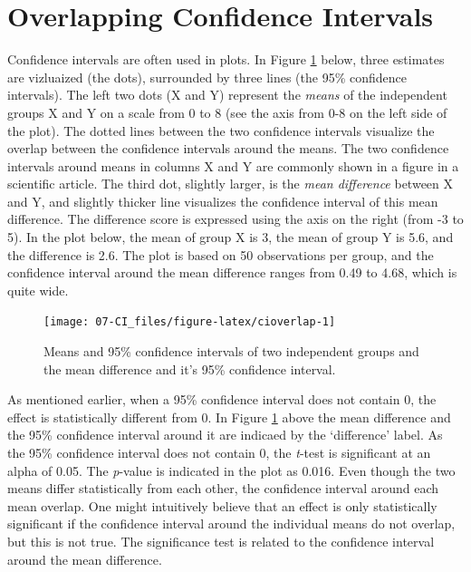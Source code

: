 \documentclass[
  oneside]{book}
\begin{document}
\hypertarget{overlapping-confidence-intervals}{%
\section{Overlapping Confidence Intervals}\label{overlapping-confidence-intervals}}

Confidence intervals are often used in plots. In Figure \ref{fig:cioverlap} below, three estimates are vizluaized (the dots), surrounded by three lines (the 95\% confidence intervals). The left two dots (X and Y) represent the \emph{means} of the independent groups X and Y on a scale from 0 to 8 (see the axis from 0-8 on the left side of the plot). The dotted lines between the two confidence intervals visualize the overlap between the confidence intervals around the means. The two confidence intervals around means in columns X and Y are commonly shown in a figure in a scientific article. The third dot, slightly larger, is the \emph{mean difference} between X and Y, and slightly thicker line visualizes the confidence interval of this mean difference. The difference score is expressed using the axis on the right (from -3 to 5). In the plot below, the mean of group X is 3, the mean of group Y is 5.6, and the difference is 2.6. The plot is based on 50 observations per group, and the confidence interval around the mean difference ranges from 0.49 to 4.68, which is quite wide.



\begin{figure}

{\centering \texttt{[image: 07-CI\_files/figure-latex/cioverlap-1]} 

}

\caption{Means and 95\% confidence intervals of two independent groups and the mean difference and it's 95\% confidence interval.}\label{fig:cioverlap}
\end{figure}

As mentioned earlier, when a 95\% confidence interval does not contain 0, the effect is statistically different from 0. In Figure \ref{fig:cioverlap} above the mean difference and the 95\% confidence interval around it are indicaed by the `difference' label. As the 95\% confidence interval does not contain 0, the \emph{t}-test is significant at an alpha of 0.05. The \emph{p}-value is indicated in the plot as 0.016. Even though the two means differ statistically from each other, the confidence interval around each mean overlap. One might intuitively believe that an effect is only statistically significant if the confidence interval around the individual means do not overlap, but this is not true. The significance test is related to the confidence interval around the mean difference.
\end{document}
